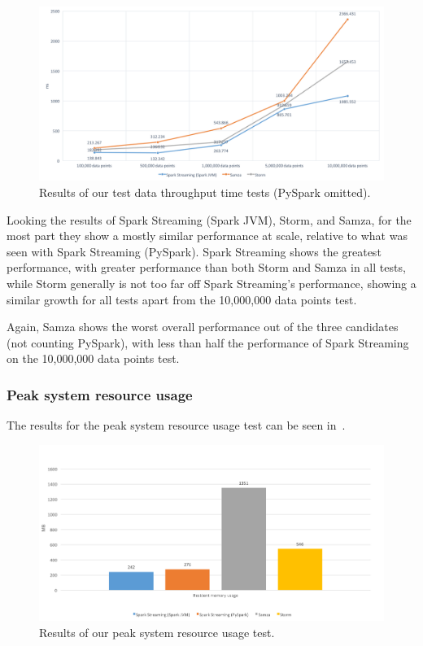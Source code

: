 \begin{figure}[ht]
  \centering
  \includegraphics[width=1\textwidth]{includes/figures/fig_throughput_nopyspark_res}
  \caption{Results of our test data throughput time tests (PySpark omitted).}
  \label{fig:throughput_time_res_nopyspark}
\end{figure}

Looking the results of Spark Streaming (Spark JVM), Storm, and Samza, for the most part they show a mostly similar performance
at scale, relative to what was seen with Spark Streaming (PySpark). Spark Streaming shows the greatest performance, with
greater performance than both Storm and Samza in all tests, while Storm generally is not too far off Spark Streaming's
performance, showing a similar growth for all tests apart from the 10,\@000,\@000 data points test.

Again, Samza shows the worst overall performance out of the three candidates (not counting PySpark), with less than
half the performance of Spark Streaming on the 10,\@000,\@000 data points test.

\subsubsection{Peak system resource usage}

The results for the peak system resource usage test can be seen in~.

\begin{figure}[ht]
  \centering
  \includegraphics[width=1\textwidth]{includes/figures/fig_peak_resource_res}
  \caption{Results of our peak system resource usage test.}
  \label{fig:resource_usage_res}
\end{figure}

